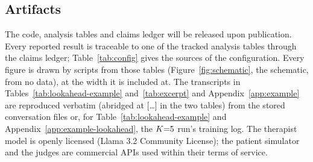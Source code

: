 \subsection{Artifacts}

The code, analysis tables and claims ledger will be released upon publication.
Every reported result is traceable to one of the tracked analysis tables through the claims
ledger; Table~\ref{tab:config} gives the sources of the configuration. Every figure is drawn by scripts from those tables (Figure~\ref{fig:schematic},
the schematic, from no data), at the width it is included at. The
transcripts in Tables~\ref{tab:lookahead-example} and~\ref{tab:excerpt} and Appendix~\ref{app:example}
are reproduced verbatim (abridged at [\ldots] in the two tables) from the stored conversation files
or, for Table~\ref{tab:lookahead-example} and Appendix~\ref{app:example-lookahead}, the $K{=}5$ run's
training log. The
therapist model is openly licensed (Llama 3.2 Community License); the patient simulator and the judges are commercial APIs used
within their terms of service.
